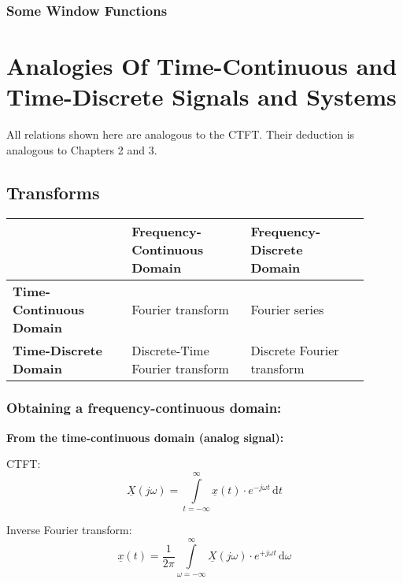 \begin{refsection}
\begin{landscape}
	\subsubsection{Some Window Functions}
\end{landscape}


\section{Analogies Of Time-Continuous and Time-Discrete Signals and Systems}

All relations shown here are analogous to the \ac{CTFT}. Their deduction is analogous to Chapters 2 and 3.

\subsection{Transforms}

\begin{table}[H]
	\centering
	\begin{tabular}{|p{0.3\linewidth}||p{0.3\linewidth}|p{0.3\linewidth}|}
		\hline
		{} & \textbf{Frequency-Continuous Domain} & \textbf{Frequency-Discrete Domain} \\
		\hline
		\hline
		\textbf{Time-Continuous Domain} & Fourier transform & Fourier series \\
		\hline
		\textbf{Time-Discrete Domain} & Discrete-Time Fourier transform & Discrete Fourier transform \\
		\hline
	\end{tabular}
\end{table}

\subsubsection{Obtaining a frequency-continuous domain:}

\begin{minipage}{0.45\linewidth}
	\textbf{From the time-continuous domain (analog signal):}
	
	\vspace{0.5em}
	
	\acf{CTFT}:
	\begin{equation*}
		\underline{X}(j \omega) = \int\limits_{t = -\infty}^{\infty} \underline{x}(t) \cdot e^{-j \omega t} \, \mathrm{d} t
	\end{equation*}
	
	Inverse Fourier transform:
	\begin{equation*}
		\underline{x}(t) = \frac{1}{2 \pi} \int\limits_{\omega = -\infty}^{\infty} \underline{X}(j \omega) \cdot e^{+ j \omega t} \, \mathrm{d} \omega
	\end{equation*}
	

\end{minipage}
\end{refsection}
